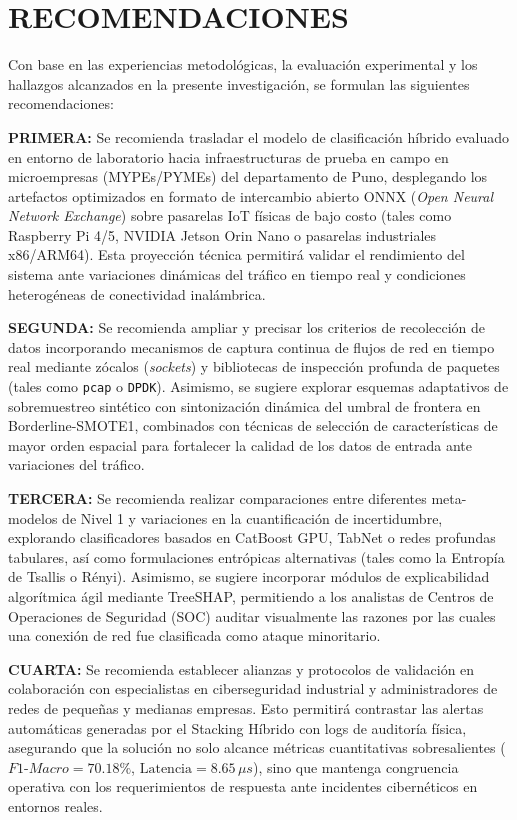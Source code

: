 \chapter{RECOMENDACIONES}

Con base en las experiencias metodológicas, la evaluación experimental y los hallazgos alcanzados en la presente investigación, se formulan las siguientes recomendaciones:

\noindent \textbf{PRIMERA:} Se recomienda trasladar el modelo de clasificación híbrido evaluado en entorno de laboratorio hacia infraestructuras de prueba en campo en microempresas (MYPEs/PYMEs) del departamento de Puno, desplegando los artefactos optimizados en formato de intercambio abierto ONNX (\textit{Open Neural Network Exchange}) sobre pasarelas IoT físicas de bajo costo (tales como Raspberry Pi 4/5, NVIDIA Jetson Orin Nano o pasarelas industriales x86/ARM64). Esta proyección técnica permitirá validar el rendimiento del sistema ante variaciones dinámicas del tráfico en tiempo real y condiciones heterogéneas de conectividad inalámbrica.

\vspace{0.8em}
\noindent \textbf{SEGUNDA:} Se recomienda ampliar y precisar los criterios de recolección de datos incorporando mecanismos de captura continua de flujos de red en tiempo real mediante zócalos (\textit{sockets}) y bibliotecas de inspección profunda de paquetes (tales como \texttt{pcap} o \texttt{DPDK}). Asimismo, se sugiere explorar esquemas adaptativos de sobremuestreo sintético con sintonización dinámica del umbral de frontera en Borderline-SMOTE1, combinados con técnicas de selección de características de mayor orden espacial para fortalecer la calidad de los datos de entrada ante variaciones del tráfico.

\vspace{0.8em}
\noindent \textbf{TERCERA:} Se recomienda realizar comparaciones entre diferentes meta-modelos de Nivel 1 y variaciones en la cuantificación de incertidumbre, explorando clasificadores basados en CatBoost GPU, TabNet o redes profundas tabulares, así como formulaciones entrópicas alternativas (tales como la Entropía de Tsallis o Rényi). Asimismo, se sugiere incorporar módulos de explicabilidad algorítmica ágil mediante TreeSHAP, permitiendo a los analistas de Centros de Operaciones de Seguridad (SOC) auditar visualmente las razones por las cuales una conexión de red fue clasificada como ataque minoritario.

\vspace{0.8em}
\noindent \textbf{CUARTA:} Se recomienda establecer alianzas y protocolos de validación en colaboración con especialistas en ciberseguridad industrial y administradores de redes de pequeñas y medianas empresas. Esto permitirá contrastar las alertas automáticas generadas por el Stacking Híbrido con logs de auditoría física, asegurando que la solución no solo alcance métricas cuantitativas sobresalientes ($F1\text{-}Macro = 70.18\%$, $\mathrm{Latencia} = 8.65\,\mu s$), sino que mantenga congruencia operativa con los requerimientos de respuesta ante incidentes cibernéticos en entornos reales.